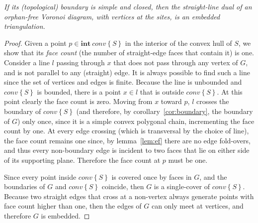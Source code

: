 \documentclass[11pt]{article}
\newcommand{\Sites}{S}
\newcommand{\CHS}{{conv}\left\{\Sites\right\}}
\begin{document}
\emph{
If its (topological) boundary is simple and closed, 
	then the straight-line dual of an orphan-free Voronoi diagram, 
	with vertices at the sites, 
	is an embedded triangulation. 
}
\begin{proof}


Given a point $p\in\mathbf{int\ }{\CHS}$ in
the interior of the convex hull of $\Sites$, we show that its \emph{face count}
(the number of straight-edge faces that contain it) is one. 
Consider a line $l$ passing through $x$ that does not pass through any vertex of
$G$, and is not parallel to any (straight) edge. 
It is always possible to find such a line since the set of vertices and edges is finite. 
Because the line is unbounded and $\CHS$ is bounded, there is a
point $x\in l$ that is outside $\CHS$. At this point clearly the
face count is zero. 
Moving from $x$ toward $p$, $l$ crosses the boundary of $\CHS$
(and therefore, by corollary~\ref{cor:boundary}, the boundary of $G$) 
only once, since it is a simple convex polygonal chain, incrementing the face
count by one. At every edge crossing (which is transversal by the choice of
line), the face count remains one since, by lemma~\ref{lem:ef} there are no
edge fold-overs, and thus every non-boundary edge is incident to two faces
that lie on either side of its supporting plane. Therefore the face count at
$p$ must be one. 


Since every point inside $\CHS$ is covered once by faces in
$G$,
and the boundaries of $G$ and $\CHS$ coincide, then
$G$ is a single-cover
of $\CHS$. 
Because two straight edges that cross at a non-vertex always generate points with
face count higher than one, then the edges of $G$ can only meet at vertices, and
therefore $G$ is embedded. 
\end{proof}
\end{document}
